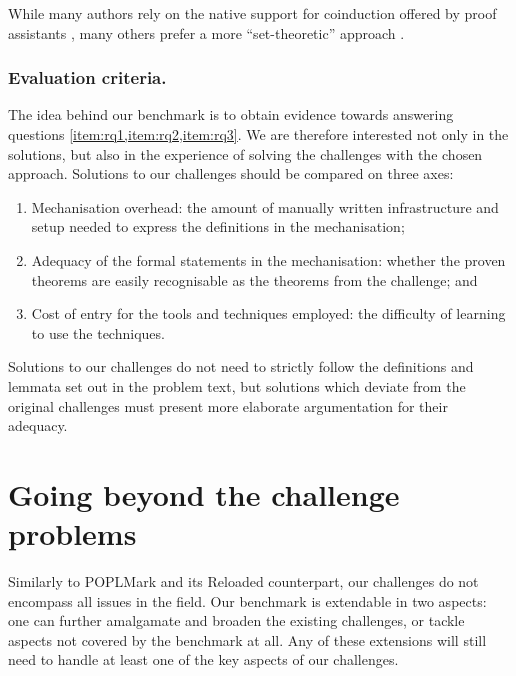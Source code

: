 \documentclass[runningheads]{llncs}
\begin{document}
While many authors rely on the native support for coinduction offered
by proof assistants
\cite{Honsell2001,Bengtson2016,Kahsai2008,Thiemann2019,Gay2020}, many
others prefer a more ``set-theoretic'' approach
\cite{Hirschkoff1997,Bengtson2009,Maksimovic2015,Pohjola2022}.

\subsubsection{Evaluation criteria.}
The idea behind our benchmark is to obtain evidence towards answering
questions \cref{item:rq1,item:rq2,item:rq3}. We are therefore
interested not only in the solutions, but also in the experience of
solving the challenges with the chosen approach.  Solutions to our
challenges should be compared on three axes:
\begin{enumerate}
\item Mechanisation overhead: the amount of manually written infrastructure and setup needed to express the definitions in the mechanisation;
\item Adequacy of the formal statements in the mechanisation: whether the proven theorems are easily recognisable as the theorems from the challenge; and
\item Cost of entry for the tools and techniques employed: the difficulty of learning to use the techniques.
\end{enumerate}
Solutions to our challenges do not need to strictly follow the definitions and lemmata set out in the problem text, but solutions which deviate from the original challenges must present more elaborate argumentation for their adequacy.


\section{Going beyond the challenge problems}\label{sec:going-beyond}
Similarly to POPLMark and its Reloaded counterpart, our challenges do not encompass all issues in the field.
Our benchmark is extendable in two aspects: one can further amalgamate and broaden the existing challenges, or tackle aspects not covered by the benchmark at all.
Any of these extensions will still need to handle at least one of the key aspects of our challenges.
\end{document}
